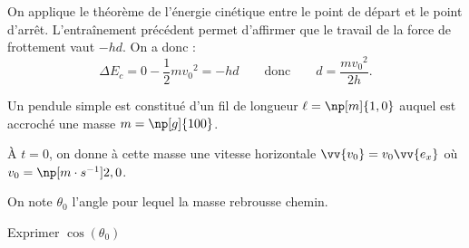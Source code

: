 \reponse{\reponseC{}}

\begin{corrige}
On applique le théorème de l'énergie cinétique entre le point de départ et le point d'arrêt. L'entraînement précédent permet d'affirmer que le travail de la force de frottement vaut $-hd$. On a donc :
\[
\Delta E_c = 0-\frac{1}{2}m{v_0}^2 = -hd \qquad\text{donc}\qquad d = \frac{m{v_0}^2}{2h}.
\]
\end{corrige}


\finEntrainement







\hauteurLargeurCadreReponse		{8mm}{5cm}
\typeEntrainement				{} %
\initialisationEntrainement

Un pendule simple est constitué d'un fil de longueur $\ell=\np[m]{1,0}$ auquel est accroché une masse $m=\np[g]{100}$. 

À $t=0$, on donne à cette masse une vitesse horizontale $\vv{v_0}=v_0  \vv{e_x}$ où $v_0=\np[m\cdot s^{-1}]{2,0}$. 

On note $\theta_0$ l'angle pour lequel la masse rebrousse chemin.


\debutEntrainement


\begin{enonce}
Exprimer $\cos(\theta_0)$
\end{enonce}


